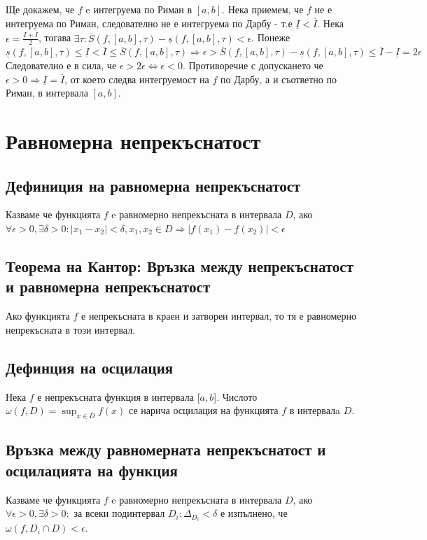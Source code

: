 \documentclass[fleqn,12pt]{article}
\begin{document}
\begin{flushleft}
Ще докажем, че $f$ e интегруема по Риман в $[a,b]$. Нека приемем, че $f$ не е интегруема по Риман, следователно не е интегруема по Дарбу - т.е $\underline{I} < \overline{I}$.
Нека $\epsilon = \frac{\underline{I} + \overline{I}}{2}$, тогава $\exists\tau : \overline{S}(f,[a,b],\tau) - \underline{s}(f,[a,b],\tau) < \epsilon$.
Понеже $\underline{s}(f,[a,b],\tau) \leq \underline{I} < \overline{I} \leq \overline{S}(f,[a,b],\tau) \Longrightarrow \epsilon > \overline{S}(f,[a,b],\tau) - \underline{s}(f,[a,b],\tau) \leq \overline{I} - \underline{I} = 2\epsilon$
Следователно е в сила, че $\epsilon > 2\epsilon \Leftrightarrow \epsilon < 0$.
Противоречие с допускането че $\epsilon>0 \Longrightarrow \underline{I}=\overline{I}$, от което следва интегруемост на $f$ по Дарбу, а и съответно по Риман, в интервала $[a,b]$.

\section{Равномерна непрекъснатост}

\subsection{Дефиниция на равномерна непрекъснатост}
Казваме че функцията $f$ e равномерно непрекъсната в интервала $D$, ако $\forall \epsilon>0, \exists \delta>0 : |x_1 - x_2|<\delta, x_1,x_2 \in D \Longrightarrow |f(x_1)-f(x_2)|<\epsilon$

\subsection{Теорема на Кантор: Връзка между непрекъснатост и равномерна непрекъснатост}
Ако функцията $f$ е непрекъсната в краен и затворен интервал, то тя е равномерно непрекъсната в този интервал.

\subsection{Дефинция на осцилация}
Нека $f$ е непрекъсната функция в интервала $[a,b$]. Числото $\omega(f,D) = \sup_{x \in D} f(x)$ се нарича осцилация на функцията $f$ в интервалa $D$.

\subsection{Връзка между равномерната непрекъснатост и осцилацията на функция}
Казваме че функцията $f$ e равномерно непрекъсната в интервала $D$, ако $\forall \epsilon>0, \exists \delta>0 :$ за всеки подинтервал $D_i: \Delta_{D_i} < \delta$ е изпълнено, че $\omega(f,D_i \cap D) < \epsilon$.


\end{flushleft}
\end{document}

